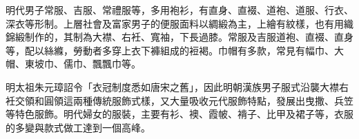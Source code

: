 明代男子常服、吉服、常禮服等，多用袍衫，有直身、直裰、道袍、道服、行衣、深衣等形制。上層社會及富家男子的便服面料以綢緞為主，上繪有紋樣，也有用織錦緞制作的，其制為大襟、右衽、寬袖，下長過膝。常服及吉服道袍、直裰、直身等，配以絲縧，勞動者多穿上衣下褲組成的裋褐。巾帽有多款，常見有幅巾、大帽、東坡巾、儒巾、飄飄巾等。

明太祖朱元璋詔令「衣冠制度悉如唐宋之舊」，因此明朝漢族男子服式沿襲大襟右衽交領和圓領這兩種傳統服飾式樣，又大量吸收元代服飾特點，發展出曳撒、兵笠等特色服飾。明代婦女的服裝，主要有衫、襖、霞帔、褙子、比甲及裙子等，衣服的多變與款式做工達到一個高峰。






















